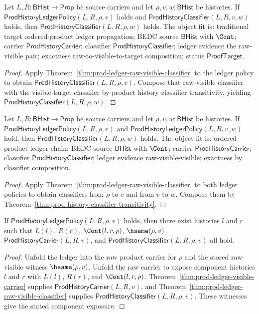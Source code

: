 \begin{theorem}
\label{thm:prod-ledger-classifier-extension}
Let $L,R:\mathsf{BHist}\to\mathsf{Prop}$ be source carriers and let
$\rho,v,w:\mathsf{BHist}$ be histories. If
$\mathsf{ProdHistoryLedgerPolicy}(L,R,\rho,v)$ holds and
$\mathsf{ProdHistoryClassifier}(L,R,v,w)$ holds, then
$\mathsf{ProdHistoryClassifier}(L,R,\rho,w)$ holds. The object fit is:
traditional target ordered-product ledger propagation; BEDC source
$\mathsf{BHist}$ with $\Cont$; carrier $\mathsf{ProdHistoryCarrier}$;
classifier $\mathsf{ProdHistoryClassifier}$; ledger evidence the raw-visible
pair; exactness raw-to-visible-to-target composition; status
$\mathsf{ProofTarget}$.
\end{theorem}
\begin{proof}
Apply Theorem~\ref{thm:prod-ledger-raw-visible-classifier} to the ledger
policy to obtain $\mathsf{ProdHistoryClassifier}(L,R,\rho,v)$. Compose that
raw-visible classifier with the visible-target classifier by product history
classifier transitivity, yielding
$\mathsf{ProdHistoryClassifier}(L,R,\rho,w)$.
\end{proof}

\begin{theorem}
\label{thm:prod-ledger-two-step-classifier-composition}
Let $L,R:\mathsf{BHist}\to\mathsf{Prop}$ be source carriers and let
$\rho,v,w:\mathsf{BHist}$ be histories. If
$\mathsf{ProdHistoryLedgerPolicy}(L,R,\rho,v)$ and
$\mathsf{ProdHistoryLedgerPolicy}(L,R,v,w)$ hold, then
$\mathsf{ProdHistoryClassifier}(L,R,\rho,w)$ holds. The object fit is:
ordered-product ledger chain; BEDC source $\mathsf{BHist}$ with $\Cont$;
carrier $\mathsf{ProdHistoryCarrier}$; classifier
$\mathsf{ProdHistoryClassifier}$; ledger evidence raw-visible-visible;
exactness by classifier composition.
\end{theorem}
\begin{proof}
Apply Theorem~\ref{thm:prod-ledger-raw-visible-classifier} to both ledger
policies to obtain classifiers from $\rho$ to $v$ and from $v$ to $w$. Compose
them by Theorem~\ref{thm:prod-history-classifier-transitivity}.
\end{proof}

\begin{theorem}
\label{thm:prod-ledger-component-exposure}
If $\mathsf{ProdHistoryLedgerPolicy}(L,R,\rho,v)$ holds, then there exist histories $l$ and $r$ such that $L(l)$, $R(r)$, $\Cont(l,r,\rho)$, $\hsame(\rho,v)$, $\mathsf{ProdHistoryCarrier}(L,R,v)$, and $\mathsf{ProdHistoryClassifier}(L,R,\rho,v)$ all hold.
\end{theorem}
\begin{proof}
Unfold the ledger into the raw product carrier for $\rho$ and the stored raw-visible witness $\hsame(\rho,v)$. Unfold the raw carrier to expose component histories $l$ and $r$ with $L(l)$, $R(r)$, and $\Cont(l,r,\rho)$. Theorem~\ref{thm:prod-ledger-visible-carrier} supplies $\mathsf{ProdHistoryCarrier}(L,R,v)$, and Theorem~\ref{thm:prod-ledger-raw-visible-classifier} supplies $\mathsf{ProdHistoryClassifier}(L,R,\rho,v)$. These witnesses give the stated component exposure.
\end{proof}

